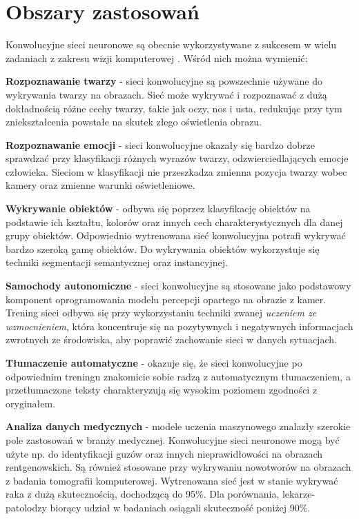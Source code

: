 \section{Obszary zastosowań}
Konwolucyjne sieci neuronowe są obecnie wykorzystywane z sukcesem w wielu zadaniach z zakresu wizji komputerowej \cite{kumar:cnnApplications}. Wśród nich można wymienić:
\begin{enumerate*}
\item \textbf{Rozpoznawanie twarzy} - sieci konwolucyjne są powszechnie używane do wykrywania twarzy na obrazach. Sieć może wykrywać i rozpoznawać z dużą dokładnością różne cechy twarzy, takie jak oczy, nos i usta, redukując przy tym zniekształcenia powstałe na skutek złego oświetlenia obrazu.
\item \textbf{Rozpoznawanie emocji} - sieci konwolucyjne okazały się bardzo dobrze sprawdzać przy klasyfikacji różnych wyrazów twarzy, odzwierciedlających emocje człowieka. Sieciom w klasyfikacji nie przeszkadza zmienna pozycja twarzy wobec kamery oraz zmienne warunki oświetleniowe.
\item \textbf{Wykrywanie obiektów} - odbywa się poprzez klasyfikację obiektów na podstawie ich kształtu, kolorów oraz innych cech charakterystycznych dla danej grupy obiektów. Odpowiednio wytrenowana sieć konwolucyjna potrafi wykrywać bardzo szeroką gamę obiektów. Do wykrywania obiektów wykorzystuje się techniki segmentacji semantycznej oraz instancyjnej.
\item \textbf{Samochody autonomiczne} - sieci konwolucyjne są stosowane jako podstawowy komponent oprogramowania modelu percepcji opartego na obrazie z kamer. Trening sieci odbywa się przy wykorzystaniu techniki zwanej \textit{uczeniem ze wzmocnieniem}, która koncentruje się na pozytywnych i negatywnych informacjach zwrotnych ze środowiska, aby poprawić zachowanie sieci w danych sytuacjach.
\item \textbf{Tłumaczenie automatyczne} - okazuje się, że sieci konwolucyjne po odpowiednim treningu znakomicie sobie radzą z automatycznym tłumaczeniem, a przetłumaczone teksty charakteryzują się wysokim poziomem zgodności z oryginałem.
\item \textbf{Analiza danych medycznych} - modele uczenia maszynowego znalazły szerokie pole zastosowań w branży medycznej. Konwolucyjne sieci neuronowe mogą być użyte np. do identyfikacji guzów oraz innych nieprawidłowości na obrazach rentgenowskich. Są również stosowane przy wykrywaniu nowotworów na obrazach z badania tomografii komputerowej. Wytrenowana sieć jest w stanie wykrywać raka z dużą skutecznością, dochodzącą do 95\%. Dla porównania, lekarze-patolodzy biorący udział w badaniach osiągali skuteczność poniżej 90\%.

\end{enumerate*}
